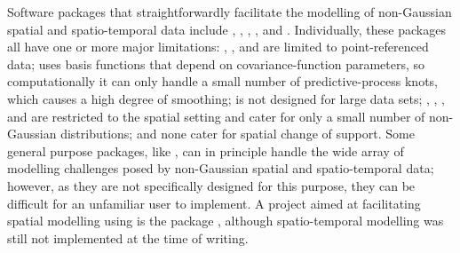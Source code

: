 \documentclass[nojss]{jss}
\begin{document}
% 

 Software packages that straightforwardly facilitate the modelling of non-Gaussian spatial and spatio-temporal data include  \citep{ngspatial_2014},  \citep{Finley_2015_spBayes},  \citep{Wood_2017_GAM:R},  \citep{Finley_2020_spNNGP}, %
 and  \citep{georob}. %
 Individually, these packages all have one or more major limitations: , , and  are limited to point-referenced data;  uses basis functions that depend on covariance-function parameters, so computationally it can only handle a small number of predictive-process knots, which causes a high degree of smoothing;  is not designed for large data sets; , , , and  are restricted to the spatial setting and cater for only a small number of non-Gaussian distributions; and none cater for spatial change of support. 
   Some general purpose packages, like  \citep{Rue_2009_INLA, Lindgren_2015_R-INLA}, can in principle handle the wide array of modelling challenges posed by non-Gaussian spatial and spatio-temporal data; however, as they are not specifically designed for this purpose, they can be difficult for an unfamiliar user to implement. 
 A project aimed at facilitating spatial modelling using  is the  package \citep{Bachl_2019_inlabru}, although spatio-temporal modelling was still not implemented at the time of writing.
 
\end{document}
